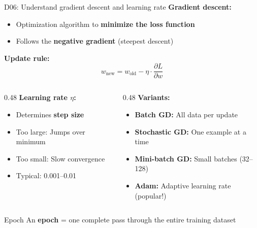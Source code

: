 \documentclass[aspectratio=169, 10pt]{beamer}
\begin{document}
\begin{frame}{D06: Understand gradient descent and learning rate}
    \textbf{Gradient descent:}
    \begin{itemize}
        \item Optimization algorithm to \textbf{minimize the loss function}
        \item Follows the \textbf{negative gradient} (steepest descent)
    \end{itemize}
    
    \vspace{0.3cm}
    \textbf{Update rule:}
    \[
    w_{\text{new}} = w_{\text{old}} - \eta \cdot \frac{\partial L}{\partial w}
    \]
    
    \begin{columns}[T]
        \begin{column}{0.48\textwidth}
            \textbf{Learning rate $\eta$:}
            \begin{itemize}
                \item Determines \textbf{step size}
                \item Too large: Jumps over minimum
                \item Too small: Slow convergence
                \item Typical: 0.001--0.01
            \end{itemize}
        \end{column}
        \begin{column}{0.48\textwidth}
            \textbf{Variants:}
            \begin{itemize}
                \item \textbf{Batch GD:} All data per update
                \item \textbf{Stochastic GD:} One example at a time
                \item \textbf{Mini-batch GD:} Small batches (32--128)
                \item \textbf{Adam:} Adaptive learning rate (popular!)
            \end{itemize}
        \end{column}
    \end{columns}
    
    \vspace{0.2cm}
    \begin{block}{\footnotesize Epoch}
        \footnotesize An \textbf{epoch} = one complete pass through the entire training dataset
    \end{block}
\end{frame}
\end{document}
